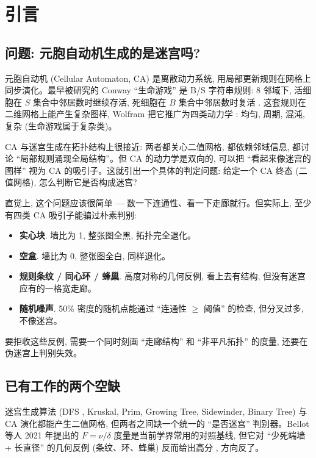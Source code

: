 
\section{引言}
\label{sec:intro}

\subsection{问题: 元胞自动机生成的是迷宫吗?}

元胞自动机 (Cellular Automaton, CA) 是离散动力系统, 用局部更新规则在网格上同步演化。最早被研究的 Conway ``生命游戏'' 是 B/S 字符串规则: 8 邻域下, 活细胞在 $S$ 集合中邻居数时继续存活, 死细胞在 $B$ 集合中邻居数时复活 \cite{conway1970}. 这套规则在二维网格上能产生复杂图样, Wolfram 把它推广为四类动力学 \cite{wolfram2002}: 均匀, 周期, 混沌, 复杂 (生命游戏属于复杂类)。

CA 与迷宫生成在拓扑结构上很接近: 两者都关心二值网格, 都依赖邻域信息, 都讨论 ``局部规则涌现全局结构''。但 CA 的动力学是双向的, 可以把 ``看起来像迷宫的图样'' 视为 CA 的吸引子。这就引出一个具体的判定问题: 给定一个 CA 终态 (二值网格), 怎么判断它是否构成迷宫?

直觉上, 这个问题应该很简单 --- 数一下连通性、看一下走廊就行。但实际上, 至少有四类 CA 吸引子能骗过朴素判别:
\begin{itemize}[leftmargin=*, itemsep=0pt, topsep=0pt]
\item \textbf{实心块}. 墙比为 1, 整张图全黑, 拓扑完全退化。
\item \textbf{空盒}. 墙比为 0, 整张图全白, 同样退化。
\item \textbf{规则条纹 / 同心环 / 蜂巢}. 高度对称的几何反例, 看上去有结构, 但没有迷宫应有的一格宽走廊。
\item \textbf{随机噪声}. 50\% 密度的随机点能通过 ``连通性 $\ge$ 阈值'' 的检查, 但分叉过多, 不像迷宫。
\end{itemize}

要拒收这些反例, 需要一个同时刻画 ``走廊结构'' 和 ``非平凡拓扑'' 的度量, 还要在伪迷宫上判别失效。

\subsection{已有工作的两个空缺}

迷宫生成算法 (DFS \cite{pech2002}, Kruskal, Prim, Growing Tree, Sidewinder, Binary Tree) 与 CA 演化都能产生二值网格, 但两者之间缺一个统一的 ``是否迷宫'' 判别器。Bellot 等人 2021 年提出的 $F = \nu / \delta$ 度量是当前学界常用的对照基线, 但它对 ``少死端墙 + 长直径'' 的几何反例 (条纹、环、蜂巢) 反而给出高分 \cite{bellot2021}, 方向反了。

